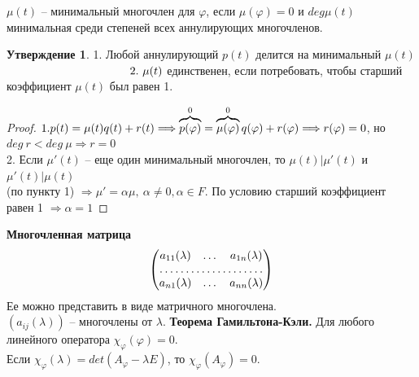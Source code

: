 \documentclass[a4paper, 12pt]{article}
\newcommand\tab[1][.5cm]{\hspace*{#1}}
\theoremstyle{definition}
\newtheorem*{subtheorem}{Утверждение}
\begin{document}
    $\mu(t)$ -- минимальный многочлен для $\varphi$, если
    $\mu(\varphi) = 0$ и $deg \mu(t)$ минимальная среди
    степеней всех аннулирующих многочленов.   

    \begin{subtheorem}
        1. Любой аннулирующий $p(t)$ делится на 
        минимальный $\mu(t)$ 
        $\tab[3.8cm]2.\ \mu(t)$ единственен, если потребовать, чтобы старший\\ \tab[4.35cm]коэффициент $\mu(t)$ был равен 1. 
    \end{subtheorem}
    \begin{proof}
        $\\1. p(t) = \mu(t)q(t) + r(t) \Longrightarrow 
        \overbrace{p(\varphi)}^{0} = \overbrace{\mu(\varphi)}^{0}
        q(\varphi) + r(\varphi)
        \Longrightarrow r(\varphi) = 0$, но\\ $deg\ r < deg\ \mu
        \Longrightarrow r = 0$\\
        2. Если $\mu'(t)$ -- еще один минимальный многочлен,
        то $\mu(t)|\mu'(t)$ и $\mu'(t)|\mu(t)$\\ (по пункту 1)
        $\Longrightarrow \mu' = \alpha \mu,\ \alpha \neq 0,
        \alpha \in F$. По условию старший коэффициент равен 1
        $\Longrightarrow  \alpha = 1$     

    \end{proof}
    \textbf{Многочленная матрица}
    $$\begin{pmatrix}
        a_{11}(\lambda) & \dots & a_{1n}(\lambda)\\
        \hdotsfor{3}\\
        a_{n1}(\lambda) & \dots & a_{nn}(\lambda)
    \end{pmatrix}$$ Ее можно представить в виде матричного
    многочлена.\\ $(a_{ij}(\lambda))$ -- многочлены от $\lambda$.
    \newpage
    \textbf{Теорема Гамильтона-Кэли.} 
         Для любого линейного оператора
        $\chi_\varphi(\varphi) = 0$.\\ Если 
        $\chi_\varphi(\lambda) = det(A_\varphi - \lambda E)$,
        то $\chi_\varphi(A_\varphi) = 0.$  
    
\end{document}
